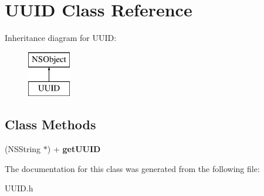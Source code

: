 \hypertarget{interface_u_u_i_d}{}\section{U\+U\+ID Class Reference}
\label{interface_u_u_i_d}
Inheritance diagram for U\+U\+ID\+:\begin{figure}[H]
\begin{center}
\leavevmode
\includegraphics[height=2.000000cm]{d1/dd7/interface_u_u_i_d}
\end{center}
\end{figure}
\subsection*{Class Methods}
\begin{DoxyCompactItemize}
\item 
\mbox{\label{interface_u_u_i_d_acf58a60f728cdda89270d7c6b146bb87}} 
(N\+S\+String $\ast$) + {\bfseries get\+U\+U\+ID}
\end{DoxyCompactItemize}


The documentation for this class was generated from the following file\+:\begin{DoxyCompactItemize}
\item 
U\+U\+I\+D.\+h\end{DoxyCompactItemize}
